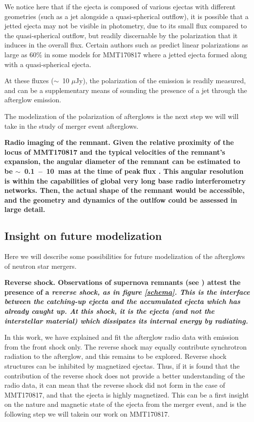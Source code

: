 We notice here that if the ejecta is composed of various ejectas with different geometries (such as a jet alongside a quasi-spherical outflow), it is possible that a jetted ejecta may not be visible in photometry, due to its small flux compared to the quasi-spherical outflow, but readily discernable by the polarization that it induces in the overall flux. Certain authors such as \cite{7} predict linear polarizations as large as 60\% in some models for MMT170817 where a jetted ejecta formed along with a quasi-spherical ejecta.

At these fluxes ($\sim$~10 $\mu$Jy), the polarization of the emission is readily measured, and can be a supplementary means of sounding the presence of a jet through the afterglow emission.

The modelization of the polarization of afterglows is the next step we will will take in the study of merger event afterglows.

\bf{Radio imaging of the remnant.} Given the relative proximity of the locus of MMT170817 and the typical velocities of the remnant's expansion, the angular diameter of the remnant can be estimated to be $\sim$~0.1~--~10~mas at the time of peak flux \cite{7}. This angular resolution is within the capabilities of global very long base radio interferometry networks. Then, the actual shape of the remnant would be accessible, and the geometry and dynamics of the outlfow could be assessed in large detail.

\subsection{Insight on future modelization}
\label{modelization}
Here we will describe some possibilities for future modelization of the afterglows of neutron star mergers.

\bf{Reverse shock.} Observations of supernova remnants (see \cite{56}) attest the presence of a \it{reverse shock}, as in figure \ref{schema}. This is the interface between the catching-up ejecta and the accumulated ejecta which has already caught up. At this shock, it is the ejecta (and not the interstellar material) which dissipates its internal energy by radiating.

In this work, we have explained and fit the afterglow radio data with emission from the front shock only. The reverse shock may equally contribute synchrotron radiation to the afterglow, and this remains to be explored. Reverse shock structures can be inhibited by magnetized ejectas. Thus, if it is found that the contribution of the reverse shock does not provide a better understanding of the radio data, it can mean that the reverse shock did not form in the case of MMT170817, and that the ejecta is highly magnetized. This can be a first insight on the nature and magnetic state of the ejecta from the merger event, and is the following step we will takein our work on MMT170817.


